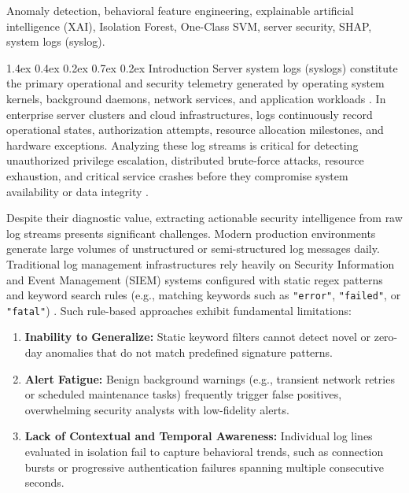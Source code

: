 \documentclass[10pt,conference]{IEEEtran}
\makeatletter
\renewcommand\section{\@startsection{section}{1}{\z@}%
  {1.4ex \@plus 0.4ex \@minus 0.2ex}%
  {0.7ex \@plus 0.2ex}%
  {\normalfont\fontsize{12pt}{14.4pt}\selectfont\bfseries\centering}}
\makeatother
\begin{document}
\begin{IEEEkeywords}
\normalfont\fontsize{10pt}{12pt}\selectfont
Anomaly detection, behavioral feature engineering, explainable artificial intelligence (XAI), Isolation Forest, One-Class SVM, server security, SHAP, system logs (syslog).
\end{IEEEkeywords}

\section{Introduction}
\label{sec:introduction}
Server system logs (syslogs) constitute the primary operational and security telemetry generated by operating system kernels, background daemons, network services, and application workloads \cite{b1}. In enterprise server clusters and cloud infrastructures, logs continuously record operational states, authorization attempts, resource allocation milestones, and hardware exceptions. Analyzing these log streams is critical for detecting unauthorized privilege escalation, distributed brute-force attacks, resource exhaustion, and critical service crashes before they compromise system availability or data integrity \cite{b2}.

Despite their diagnostic value, extracting actionable security intelligence from raw log streams presents significant challenges. Modern production environments generate large volumes of unstructured or semi-structured log messages daily. Traditional log management infrastructures rely heavily on Security Information and Event Management (SIEM) systems configured with static regex patterns and keyword search rules (e.g., matching keywords such as \texttt{"error"}, \texttt{"failed"}, or \texttt{"fatal"}) \cite{b3}. Such rule-based approaches exhibit fundamental limitations:
\begin{enumerate}
\item \textbf{Inability to Generalize:} Static keyword filters cannot detect novel or zero-day anomalies that do not match predefined signature patterns.
\item \textbf{Alert Fatigue:} Benign background warnings (e.g., transient network retries or scheduled maintenance tasks) frequently trigger false positives, overwhelming security analysts with low-fidelity alerts.
\item \textbf{Lack of Contextual and Temporal Awareness:} Individual log lines evaluated in isolation fail to capture behavioral trends, such as connection bursts or progressive authentication failures spanning multiple consecutive seconds.
\end{enumerate}
\end{document}
